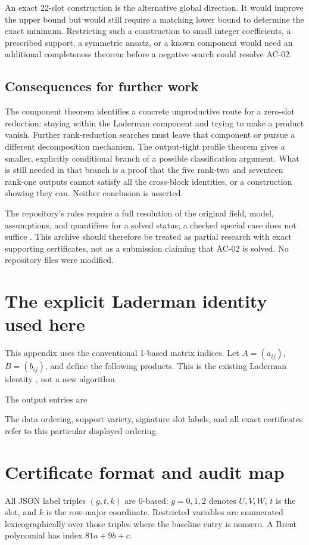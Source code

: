 \documentclass[11pt,letterpaper]{article}
\theoremstyle{definition}\newtheorem{definition}[theorem]{Definition}
\theoremstyle{remark}\newtheorem{remark}[theorem]{Remark}
\begin{document}
An exact 22-slot construction is the alternative global direction. It
would improve the upper bound but would still require a matching lower
bound to determine the exact minimum. Restricting such a construction to
small integer coefficients, a prescribed support, a symmetric ansatz, or
a known component would need an additional completeness theorem before
a negative search could resolve AC-02.

\subsection{Consequences for further work}
The component theorem identifies a concrete unproductive route for a
zero-slot reduction: staying within the Laderman component and trying to
make a product vanish. Further rank-reduction searches must leave that
component or pursue a different decomposition mechanism. The output-tight
profile theorem gives a smaller, explicitly conditional branch of a
possible classification argument. What is still needed in that branch is
a proof that the five rank-two and seventeen rank-one outputs cannot
satisfy all the cross-block identities, or a construction showing they
can. Neither conclusion is asserted.

The repository's rules require a full resolution of the original field,
model, assumptions, and quantifiers for a solved status; a checked special
case does not suffice \cite{contributing}. This archive should therefore
be treated as partial research with exact supporting certificates, not as
a submission claiming that AC-02 is solved. No repository files were
modified.

\appendix
\section{The explicit Laderman identity used here}
\label{app:laderman}
This appendix uses the conventional 1-based matrix indices. Let
$A=(a_{ij})$, $B=(b_{ij})$, and define the following products. This is the
existing Laderman identity \cite{laderman}, not a new algorithm.

The output entries are

The data ordering, support variety, signature slot labels, and all exact
certificates refer to this particular displayed ordering.

\section{Certificate format and audit map}
\label{app:cert}
All JSON label triples $(g,t,k)$ are 0-based: $g=0,1,2$ denotes $U,V,W$,
$t$ is the slot, and $k$ is the row-major coordinate. Restricted variables
are enumerated lexicographically over those triples where the baseline
entry is nonzero. A Brent polynomial has index $81a+9b+c$.
\end{document}
